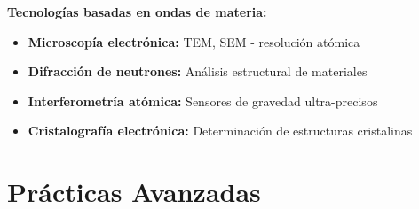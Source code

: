 \begin{tecnologiabox}
	\textbf{Tecnologías basadas en ondas de materia:}
	\begin{itemize}
		\item \textbf{Microscopía electrónica:} TEM, SEM - resolución atómica
		\item \textbf{Difracción de neutrones:} Análisis estructural de materiales
		\item \textbf{Interferometría atómica:} Sensores de gravedad ultra-precisos
		\item \textbf{Cristalografía electrónica:} Determinación de estructuras cristalinas
	\end{itemize}
\end{tecnologiabox}

\section{Prácticas Avanzadas}

